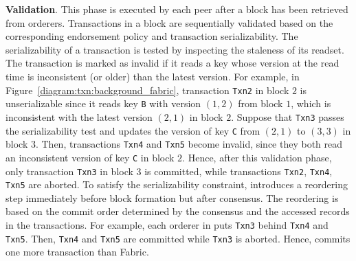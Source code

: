 \textbf{Validation}. This phase is executed by each peer after
  a block has been retrieved from orderers.
  Transactions in a block are sequentially validated based on the
  corresponding endorsement policy and transaction serializability.
  The serializability of a transaction is tested by inspecting the
  staleness of its readset. The transaction is marked as invalid if it
  reads a key whose version at the read time is inconsistent (or older) than the
  latest version.
  For example, in Figure~\ref{diagram:txn:background_fabric}, transaction \texttt{Txn2} in
  block $2$ is unserializable since it reads key \texttt{B} with version
  $(1,2)$ from block $1$, which is inconsistent with the latest version $(2,1)$
  in block $2$.
  Suppose that \texttt{Txn3} passes the serializability test and updates the version of key \texttt{C} from $(2,1)$ to $(3,3)$ in block $3$. Then, transactions \texttt{Txn4} and \texttt{Txn5} become invalid, since they both read an inconsistent version of key \texttt{C} in block $2$.
  Hence, after this validation phase, only transaction \texttt{Txn3} in
  block $3$ is committed, while transactions \texttt{Txn2}, \texttt{Txn4}, \texttt{Txn5} are aborted.
  To satisfy the serializability constraint, {\fabricPlusplus} introduces a reordering step immediately before block formation but after consensus.
  The reordering is based on the commit order determined by the consensus and the accessed records in the transactions. 
  For example, each orderer in {\fabricPlusplus} puts \texttt{Txn3} behind \texttt{Txn4} and  \texttt{Txn5}. Then, \texttt{Txn4} and \texttt{Txn5} are committed while \texttt{Txn3} is aborted. 
  Hence, {\fabricPlusplus} commits one more transaction than Fabric. 
  
